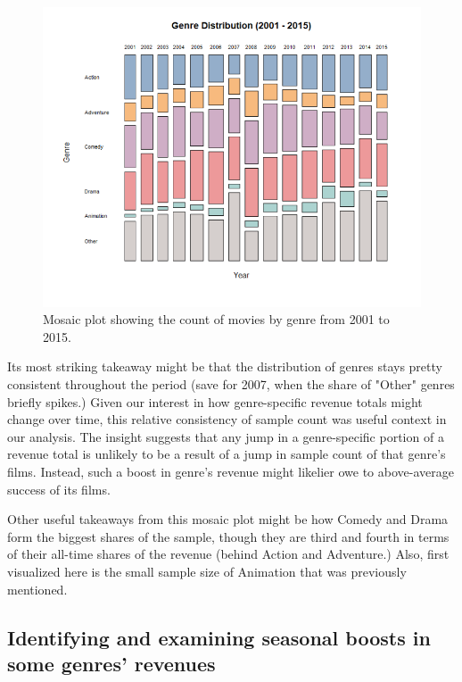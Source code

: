 \documentclass[12pt]{article}
\begin{document}
\begin{figure}[h!]
    \centering
    \includegraphics[width=1\textwidth]{images/nitheesh mosaic - genre distribution.png}
    \caption{Mosaic plot showing the count of movies by genre from 2001 to 2015.}
    \label{fig:figure_2}
\end{figure}

Its most striking takeaway might be that the distribution of genres stays pretty consistent throughout the period (save for 2007, when the share of "Other" genres briefly spikes.) Given our interest in how genre-specific revenue totals might change over time, this relative consistency of sample count was useful context in our analysis. The insight suggests that any jump in a genre-specific portion of a revenue total is unlikely to be a result of a jump in sample count of that genre's films. Instead, such a boost in genre's revenue might likelier owe to above-average success of its films.

Other useful takeaways from this mosaic plot might be how Comedy and Drama form the biggest shares of the sample, though they are third and fourth in terms of their all-time shares of the revenue (behind Action and Adventure.) Also, first visualized here is the small sample size of Animation that was previously mentioned.


\subsection{Identifying and examining seasonal boosts in some genres' revenues}
\end{document}

